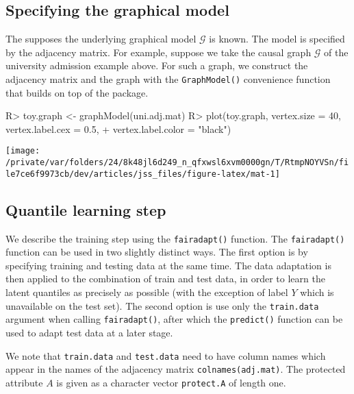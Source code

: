\documentclass[
  notitle]{jss}
\begin{document}
\hypertarget{specifying-the-graphical-model}{%
\subsection{Specifying the graphical
model}\label{specifying-the-graphical-model}}

The  supposes the underlying graphical model
\(\mathcal{G}\) is known. The model is specified by the adjacency
matrix. For example, suppose we take the causal graph \(\mathcal{G}\) of
the university admission example above. For such a graph, we construct
the adjacency matrix and the graph with the \texttt{GraphModel()}
convenience function that builds on top of the  package.

\begin{CodeChunk}
\begin{CodeInput}
R> toy.graph <- graphModel(uni.adj.mat)
R> plot(toy.graph, vertex.size = 40, vertex.label.cex = 0.5,
+   vertex.label.color = "black")
\end{CodeInput}


\begin{center}\texttt{[image: /private/var/folders/24/8k48jl6d249\_n\_qfxwsl6xvm0000gn/T/RtmpNOYVSn/file7ce6f9973cb/dev/articles/jss\_files/figure-latex/mat-1]} \end{center}

\end{CodeChunk}

\hypertarget{quantile-learning-step}{%
\subsection{Quantile learning step}\label{quantile-learning-step}}

We describe the training step using the \texttt{fairadapt()} function.
The \texttt{fairadapt()} function can be used in two slightly distinct
ways. The first option is by specifying training and testing data at the
same time. The data adaptation is then applied to the combination of
train and test data, in order to learn the latent quantiles as precisely
as possible (with the exception of label \(Y\) which is unavailable on
the test set). The second option is use only the \texttt{train.data}
argument when calling \texttt{fairadapt()}, after which the
\texttt{predict()} function can be used to adapt test data at a later
stage.

We note that \texttt{train.data} and \texttt{test.data} need to have
column names which appear in the names of the adjacency matrix
\texttt{colnames(adj.mat)}. The protected attribute \(A\) is given as a
character vector \texttt{protect.A} of length one.
\end{document}
